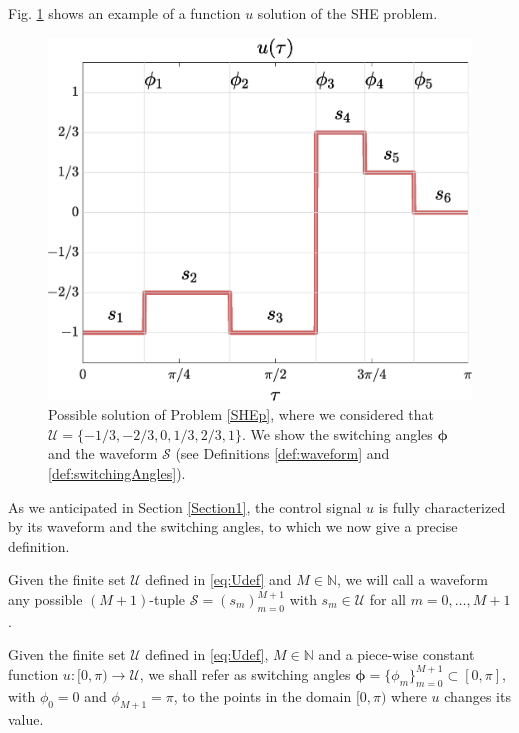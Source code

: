 Fig. \ref{fig:exampleSHE} shows an example of a function $u$ solution of the SHE problem. 
 
\begin{figure}
	\centering
	\includegraphics[scale=0.35]{img/fig01.eps} 
	\caption{Possible solution of Problem \ref{SHEp}, where we considered that $\mathcal{U} = \{-1/3, -2/3, 0, 1/3, 2/3, 1\}$. We show the switching angles $\bm{\phi}$ and the waveform $\mathcal{S}$ (see Definitions \ref{def:waveform} and \ref{def:switchingAngles}).}\label{fig:exampleSHE}
\end{figure}

As we anticipated in Section \ref{Section1}, the control signal $u$ is fully characterized by its waveform and the switching angles, to which we now give a precise definition.
\newline
\begin{definition}\label{def:waveform}
Given the finite set $\mathcal U$ defined in \eqref{eq:Udef} and $M\in\mathbb{N}$, we will call a waveform any possible $(M+1)$-tuple $\mathcal S = (s_m)_{m=0}^{M+1}$ with $s_m\in \mathcal U$ for all $m=0,\ldots,M+1$.
\end{definition}
 
\begin{definition}\label{def:switchingAngles}
Given the finite set $\mathcal U$ defined in \eqref{eq:Udef}, $M\in\mathbb{N}$ and a piece-wise constant function $u:[0,\pi) \rightarrow \mathcal{U}$, we shall refer as switching angles $\bm{\phi} = \{\phi_m\}_{m=0}^{M+1}\subset[0,\pi]$, with $\phi_0 = 0$ and $\phi_{M+1} = \pi$, to the points in the domain $[0,\pi)$ where $u$ changes its value. 
\end{definition}

